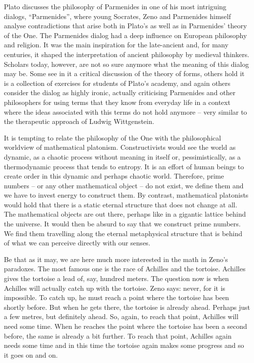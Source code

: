 \documentclass[tikz]{scrreprt}
\begin{document}
Plato discusses the philosophy of Parmenides in one
of his most intriguing dialogs, ``Parmenides'', 
where young Socrates, Zeno and Parmenides himself
analyse contradictions that arise both in Plato's
 as well as in Parmenides' theory of the One.
The Parmenides dialog had a deep influence on 
European philosophy and religion. 
It was the main inspiration for the late-ancient
 and, for many centuries,
it shaped the interpretation of ancient philosophy
by medieval thinkers.
Scholars today, however, are not so sure anymore
what the meaning of this dialog may be.
Some see in it a critical discussion of 
the theory of forms, others hold it is a collection
of exercises for students of Plato's academy,
and again others consider the dialog as highly ironic,
actually criticising Parmenides and other philosophers
for using terms that they know from everyday life 
in a context where the ideas associated with this terms
do not hold anymore -- very similar to the therapeutic
approach of Ludwig Wittgenstein.

It is tempting to relate the philosophy of the One with the
philosophical worldview of mathematical platonism.
Constructivists would see the world as dynamic,
as a chaotic process without meaning in itself or,
pessimistically, as a thermodynamic process that tends to entropy.
It is an effort of human beings to create order in this
dynamic and perhaps chaotic world.
Therefore, prime numbers -- or any other mathematical object --
do not exist, we define them and we have to
invest energy to construct them.
By contrast, mathematical platonists would hold that there
is a static eternal structure that does not change at all.
The mathematical objects are out there, perhaps like in
a gigantic lattice behind the universe.
It would then be absurd to say that we construct prime numbers.
We find them travelling along the eternal metaphysical structure
that is behind of what we can perceive directly with our senses.

Be that as it may,
we are here much more interested in the math
in Zeno's paradoxes.
The most famous one is the race
of Achilles and the tortoise.
Achilles gives the tortoise a lead of, say, hundred meters.
The question now is when Achilles will actually catch up with
the tortoise. Zeno says: never, for it is impossible.
To catch up, he must reach a point where the tortoise has been
shortly before. But when he gets there, the tortoise is already
ahead. Perhaps just a few metres, but definitely ahead.
So, again, to reach that point, Achilles will need some time.
When he reaches the point where the tortoise has been a second before,
the same is already a bit further. 
To reach that point, Achilles again needs some time
and in this time the tortoise again makes some progress
and so it goes on and on. 
\end{document}

